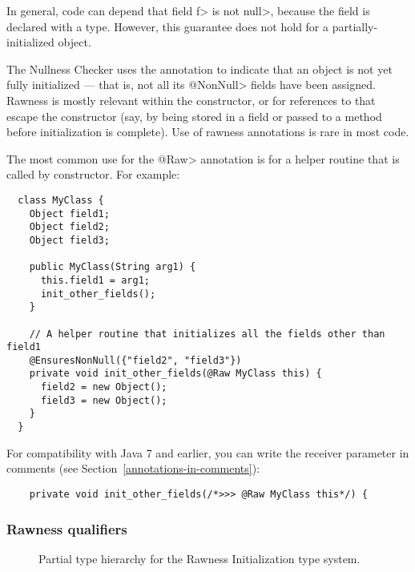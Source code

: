 \noindent
In general, code can depend that field \<f> is not \<null>, because the
field is declared with a  type.
However, this guarantee does not hold for a partially-initialized object.

The Nullness Checker uses the  annotation to indicate that an object
is not yet fully initialized --- that is, not all its \<@NonNull> fields have been
assigned.  Rawness is mostly relevant within the constructor, or for
references to  that escape the constructor (say, by being stored
in a field or passed to a method before initialization is complete).  
Use of rawness annotations is rare in most code.

The most common use for the \<@Raw> annotation is for a helper routine that
is called by constructor.  For example:

\begin{Verbatim}
  class MyClass {
    Object field1;
    Object field2;
    Object field3;

    public MyClass(String arg1) {
      this.field1 = arg1;
      init_other_fields();
    }

    // A helper routine that initializes all the fields other than field1
    @EnsuresNonNull({"field2", "field3"})
    private void init_other_fields(@Raw MyClass this) {
      field2 = new Object();
      field3 = new Object();
    }
  }
\end{Verbatim}

For compatibility with Java 7 and earlier, you can write the receiver
parameter in comments (see Section~\ref{annotations-in-comments}):
\begin{Verbatim}
    private void init_other_fields(/*>>> @Raw MyClass this*/) {
\end{Verbatim}


\subsubsection{Rawness qualifiers\label{rawness-qualifiers}}

\begin{figure}
\caption{Partial type hierarchy for the Rawness Initialization type system.}
\label{fig-rawness-hierarchy}
\end{figure}

